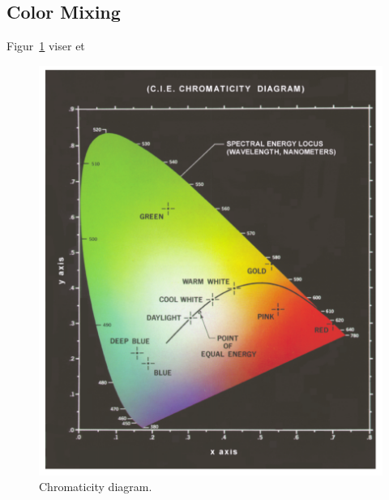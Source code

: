 \subsection{Color Mixing}

Figur~\ref{fig:chromaticity-diagram} viser et  	

\begin{figure}[h]
	\centering
	\includegraphics[width=0.7\linewidth]{figs/spm07/chromaticity-diagram}
	\caption{Chromaticity diagram.}
	\label{fig:chromaticity-diagram}
\end{figure}
